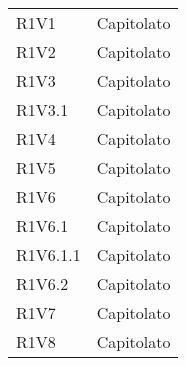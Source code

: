 \begin{longtable}{|C{6.5cm}|C{6.5cm}|}
	R1V1 & Capitolato \\

	R1V2 & Capitolato \\

	R1V3 & Capitolato \\

	R1V3.1 & Capitolato \\

	R1V4 & Capitolato \\

	R1V5 & Capitolato \\

	R1V6 & Capitolato \\

	R1V6.1 & Capitolato \\

	R1V6.1.1 & Capitolato \\

	R1V6.2 & Capitolato \\

	R1V7 & Capitolato \\
	R1V8 & Capitolato \\

	\hline

\end{longtable}
